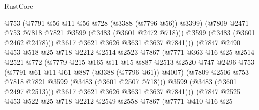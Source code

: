 \begin{lexlean}{RustCore}
\begin{coremodule}
                                    @753
                                    (@7791 @56 @11 @56 @728 (@3388 (@7796 @56)) @3399)
                                    (@7809 @2471 @753 @7818 @7821 @3599 (@3483 (@3601 @2472 @718)))
                                    @3599
                                    (@3483 (@3601 @2462 @2478)))
                                  @3617
                                  @3621
                                  @3626
                                  @3631
                                  @3637
                                  @7841)))
                            (@7847
                              @2490
                              @453
                              @518
                              @25
                              @718
                              @2212
                              @2514
                              @2523
                              @7867
                              (@7771
                                @363
                                @16
                                @25
                                @2514
                                @2521
                                @772
                                (@7779
                                  @215
                                  @165
                                  @11
                                  @15
                                  @887
                                  @2513
                                  @2520
                                  @747
                                  @2496
                                  @753
                                  (@7791 @61 @11 @61 @887 (@3388 (@7796 @61)) @4007)
                                  (@7809 @2506 @753 @7818 @7821 @3599 (@3483 (@3601 @2507 @718)))
                                  @3599
                                  (@3483 (@3601 @2497 @2513)))
                                @3617
                                @3621
                                @3626
                                @3631
                                @3637
                                @7841)))
                          (@7847
                            @2525
                            @453
                            @522
                            @25
                            @718
                            @2212
                            @2549
                            @2558
                            @7867
                            (@7771
                              @410
                              @16
                              @25

\end{coremodule}
\end{lexlean}
